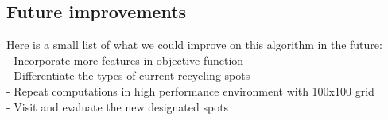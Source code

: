 \subsection{Future improvements}
Here is a small list of what we could improve on this algorithm in the future:\\
- Incorporate more features in objective function \\
- Differentiate the types of current recycling spots \\
- Repeat computations in high performance environment with 100x100 grid \\
- Visit and evaluate the new designated spots
